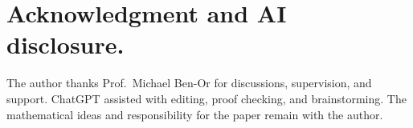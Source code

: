 \documentclass[manuscript,screen,review]{acmart}
\begin{document}

\tableofcontents
\newpage




\ifdefined\FULL


\fi







%




\ifdefined\FULL






\fi



%






%


% 
%



\section{Acknowledgment and AI disclosure.}
The author thanks Prof.~Michael Ben-Or for discussions, supervision, and support. ChatGPT assisted with editing, proof checking, and brainstorming. The mathematical ideas and responsibility for the paper remain with the author.

\printbibliography
% 
\end{document}
